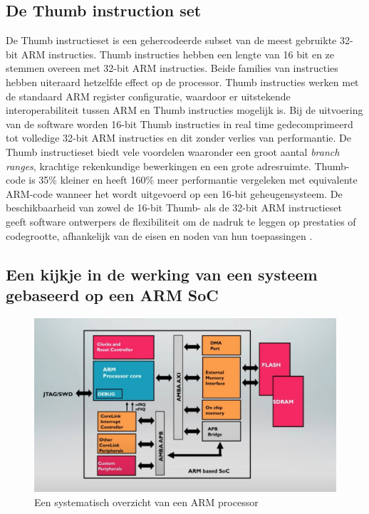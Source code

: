 \subsection{De Thumb instruction set}
De Thumb instructieset is een gehercodeerde subset van de meest gebruikte 32-bit ARM instructies. Thumb instructies hebben een lengte van 16 bit en ze stemmen overeen met 32-bit ARM instructies. Beide families van instructies hebben uiteraard hetzelfde effect op de processor. Thumb instructies werken met de standaard ARM register configuratie, waardoor er uitstekende interoperabiliteit tussen ARM en Thumb instructies mogelijk is. Bij de uitvoering van de software worden 16-bit Thumb instructies in real time gedecomprimeerd tot volledige 32-bit ARM instructies en dit zonder verlies van performantie. De Thumb instructieset biedt vele voordelen waaronder een groot aantal \textit{branch ranges}, krachtige rekenkundige bewerkingen en een grote adresruimte. Thumb-code is 35\% kleiner en heeft 160\% meer performantie vergeleken met equivalente ARM-code wanneer het wordt uitgevoerd op een 16-bit geheugensysteem. De beschikbaarheid van zowel de 16-bit Thumb- als de 32-bit ARM instructieset geeft software ontwerpers de flexibiliteit om de nadruk te leggen op prestaties of codegrootte, afhankelijk van de eisen en noden van hun toepassingen \autocite{armDeveloper2004}.

\subsection{Een kijkje in de werking van een systeem gebaseerd op een ARM SoC}

\begin{figure}[!htb]
    \centering
    \includegraphics[width=\linewidth]{img/ARMCPUarchitecture.jpg}
    \caption{Een systematisch overzicht van een ARM processor \autocite{Shaw2013}}
\end{figure}

